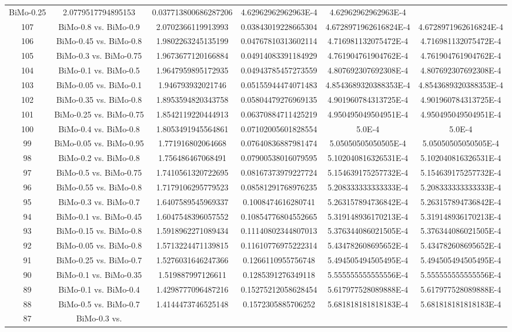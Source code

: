 \documentclass[a4paper,10pt]{article}
\begin{document}
\begin{landscape}
\begin{table}[!htp]
\begin{tabular}{cccccc}
BiMo-0.25&2.0779517794895153&0.037713800686287206&4.62962962962963E-4&4.62962962962963E-4\\107&BiMo-0.8 vs. BiMo-0.9&2.0702366119913993&0.03843019228665304&4.6728971962616824E-4&4.6728971962616824E-4\\106&BiMo-0.45 vs. BiMo-0.8&1.9802263245135199&0.04767810313602114&4.716981132075472E-4&4.716981132075472E-4\\105&BiMo-0.3 vs. BiMo-0.75&1.9673677120166884&0.04914083391184929&4.761904761904762E-4&4.761904761904762E-4\\104&BiMo-0.1 vs. BiMo-0.5&1.9647959895172935&0.04943785457273559&4.807692307692308E-4&4.807692307692308E-4\\103&BiMo-0.05 vs. BiMo-0.1&1.946793932021746&0.05155944474071483&4.8543689320388353E-4&4.8543689320388353E-4\\102&BiMo-0.35 vs. BiMo-0.8&1.8953594820343758&0.05804479276969135&4.901960784313725E-4&4.901960784313725E-4\\101&BiMo-0.25 vs. BiMo-0.75&1.8542119220444913&0.06370884711425219&4.950495049504951E-4&4.950495049504951E-4\\100&BiMo-0.4 vs. BiMo-0.8&1.8053491945564861&0.07102005601828554&5.0E-4&5.0E-4\\99&BiMo-0.05 vs. BiMo-0.95&1.771916802064668&0.07640836887981474&5.05050505050505E-4&5.05050505050505E-4\\98&BiMo-0.2 vs. BiMo-0.8&1.756486467068491&0.07900538016079595&5.102040816326531E-4&5.102040816326531E-4\\97&BiMo-0.5 vs. BiMo-0.75&1.7410561320722695&0.08167373979227724&5.154639175257732E-4&5.154639175257732E-4\\96&BiMo-0.55 vs. BiMo-0.8&1.7179106295779523&0.08581291768976235&5.208333333333333E-4&5.208333333333333E-4\\95&BiMo-0.3 vs. BiMo-0.7&1.6407589545969337&0.1008474616280741&5.263157894736842E-4&5.263157894736842E-4\\94&BiMo-0.1 vs. BiMo-0.45&1.6047548396057552&0.10854776804552665&5.319148936170213E-4&5.319148936170213E-4\\93&BiMo-0.15 vs. BiMo-0.8&1.5918962271089434&0.11140802344807013&5.376344086021505E-4&5.376344086021505E-4\\92&BiMo-0.05 vs. BiMo-0.8&1.5713224471139815&0.11610776975222314&5.434782608695652E-4&5.434782608695652E-4\\91&BiMo-0.25 vs. BiMo-0.7&1.5276031646247366&0.1266110955756748&5.494505494505495E-4&5.494505494505495E-4\\90&BiMo-0.1 vs. BiMo-0.35&1.519887997126611&0.1285391276349118&5.555555555555556E-4&5.555555555555556E-4\\89&BiMo-0.1 vs. BiMo-0.4&1.4298777096487216&0.15275212058628454&5.617977528089888E-4&5.617977528089888E-4\\88&BiMo-0.5 vs. BiMo-0.7&1.4144473746525148&0.1572305885706252&5.681818181818183E-4&5.681818181818183E-4\\87&BiMo-0.3 vs. 
\end{tabular}
\end{table}
\end{landscape}
\end{document}
